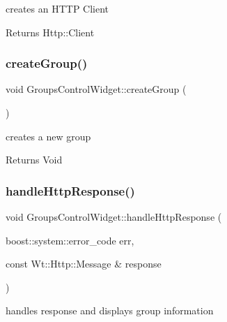 creates an H\+T\+TP Client 

\begin{DoxyReturn}{Returns}
Http\+::\+Client 
\end{DoxyReturn}
\mbox{\label{class_groups_control_widget_a891bad4ba589f7bd7be8cb09a0910f20}} 
\subsubsection{\texorpdfstring{create\+Group()}{createGroup()}}
{\footnotesize\ttfamily void Groups\+Control\+Widget\+::create\+Group (\begin{DoxyParamCaption}{ }\end{DoxyParamCaption})\hspace{0.3cm}{\ttfamily [private]}}



creates a new group 

\begin{DoxyReturn}{Returns}
Void 
\end{DoxyReturn}
\mbox{\label{class_groups_control_widget_ad5282b45d7e299bdac0813a8a72f6d3a}} 
\subsubsection{\texorpdfstring{handle\+Http\+Response()}{handleHttpResponse()}}
{\footnotesize\ttfamily void Groups\+Control\+Widget\+::handle\+Http\+Response (\begin{DoxyParamCaption}\item[{boost\+::system\+::error\+\_\+code}]{err,  }\item[{const Wt\+::\+Http\+::\+Message \&}]{response }\end{DoxyParamCaption})\hspace{0.3cm}{\ttfamily [private]}}



handles response and displays group information 


